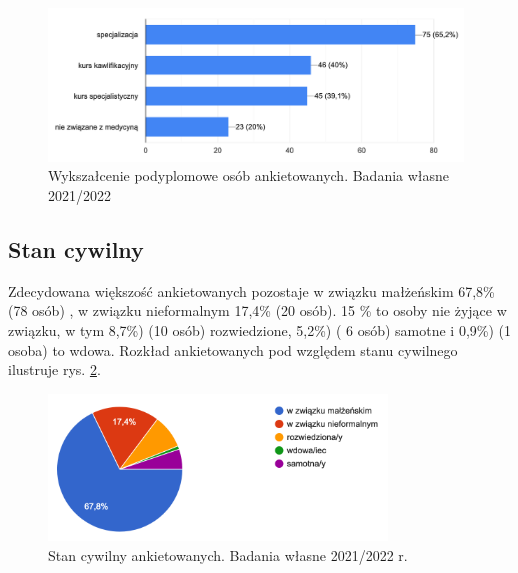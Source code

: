 \documentclass[a4paper,12pt,twoside,openright]{mwrep}
\begin{document}
\begin{figure}[H]
\centering
\includegraphics[width=11cm]{char_gr_bad/podyplom00}
\caption{Wykszałcenie podyplomowe osób ankietowanych. Badania własne 2021/2022}
\label{rys:podyplom}
\end{figure}


\subsection*{Stan cywilny}
Zdecydowana większość ankietowanych pozostaje  w związku małżeńskim 67,8\%  (78 osób) , w związku nieformalnym 17,4\% (20 osób). 15 \% to osoby nie żyjące w związku, w tym  8,7\%) (10 osób) rozwiedzione,  5,2\%) ( 6 osób) samotne i 0,9\%)  (1 osoba)  to wdowa. Rozkład ankietowanych pod względem stanu cywilnego ilustruje rys. \ref{rys:cywil}.

\begin{figure}[H]
\centering
\includegraphics[width=9cm]{char_gr_bad/cyw00}
\caption{Stan cywilny ankietowanych. Badania własne 2021/2022 r.}
\label{rys:cywil}
\end{figure}
\end{document}
